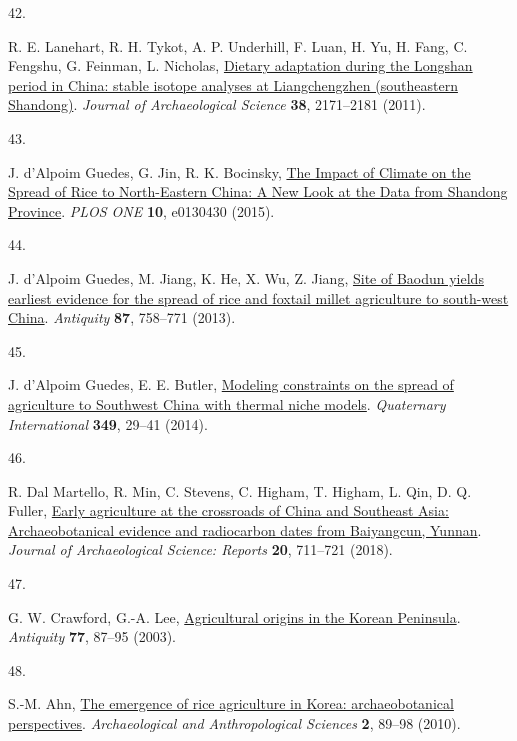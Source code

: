 \documentclass[
  letterpaper,
  DIV=11,
  numbers=noendperiod]{scrartcl}
\newlength{\cslhangindent}
\newlength{\csllabelwidth}
\newenvironment{CSLReferences}[2] %
 {\begin{list}{}{%
  \setlength{\itemindent}{0pt}
  \setlength{\leftmargin}{0pt}
  \setlength{\parsep}{0pt}
  \ifodd #1
   \setlength{\leftmargin}{\cslhangindent}
   \setlength{\itemindent}{-1\cslhangindent}
  \fi
  \setlength{\itemsep}{#2\baselineskip}}}
 {\end{list}}
\newcommand{\CSLLeftMargin}[1]{\parbox[t]{\csllabelwidth}{\strut#1\strut}}
\newcommand{\CSLRightInline}[1]{\parbox[t]{\linewidth - \csllabelwidth}{\strut#1\strut}}
\begin{document}
\begin{CSLReferences}{0}{1}
\CSLLeftMargin{42. }%
\CSLRightInline{R. E. Lanehart, R. H. Tykot, A. P. Underhill, F. Luan,
H. Yu, H. Fang, C. Fengshu, G. Feinman, L. Nicholas,
\href{https://doi.org/10.1016/j.jas.2011.03.011}{Dietary adaptation
during the Longshan period in China: stable isotope analyses at
Liangchengzhen (southeastern Shandong)}. \emph{Journal of Archaeological
Science} \textbf{38}, 2171--2181 (2011).}

\CSLLeftMargin{43. }%
\CSLRightInline{J. d'Alpoim Guedes, G. Jin, R. K. Bocinsky,
\href{https://doi.org/10/f7sgnj}{The Impact of Climate on the Spread of
Rice to North-Eastern China: A New Look at the Data from Shandong
Province}. \emph{PLOS ONE} \textbf{10}, e0130430 (2015).}

\CSLLeftMargin{44. }%
\CSLRightInline{J. d'Alpoim Guedes, M. Jiang, K. He, X. Wu, Z. Jiang,
\href{https://doi.org/10.1017/S0003598X00049449}{Site of Baodun yields
earliest evidence for the spread of rice and foxtail millet agriculture
to south-west China}. \emph{Antiquity} \textbf{87}, 758--771 (2013).}

\CSLLeftMargin{45. }%
\CSLRightInline{J. d'Alpoim Guedes, E. E. Butler,
\href{https://doi.org/10/f6qj7q}{Modeling constraints on the spread of
agriculture to Southwest China with thermal niche models}.
\emph{Quaternary International} \textbf{349}, 29--41 (2014).}

\CSLLeftMargin{46. }%
\CSLRightInline{R. Dal Martello, R. Min, C. Stevens, C. Higham, T.
Higham, L. Qin, D. Q. Fuller,
\href{https://doi.org/10.1016/j.jasrep.2018.06.005}{Early agriculture at
the crossroads of China and Southeast Asia: Archaeobotanical evidence
and radiocarbon dates from Baiyangcun, Yunnan}. \emph{Journal of
Archaeological Science: Reports} \textbf{20}, 711--721 (2018).}

\CSLLeftMargin{47. }%
\CSLRightInline{G. W. Crawford, G.-A. Lee,
\href{https://doi.org/10.1017/S0003598X00061378}{Agricultural origins in
the Korean Peninsula}. \emph{Antiquity} \textbf{77}, 87--95 (2003).}

\CSLLeftMargin{48. }%
\CSLRightInline{S.-M. Ahn,
\href{https://doi.org/10.1007/s12520-010-0029-9}{The emergence of rice
agriculture in Korea: archaeobotanical perspectives}.
\emph{Archaeological and Anthropological Sciences} \textbf{2}, 89--98
(2010).}


\end{CSLReferences}
\end{document}
